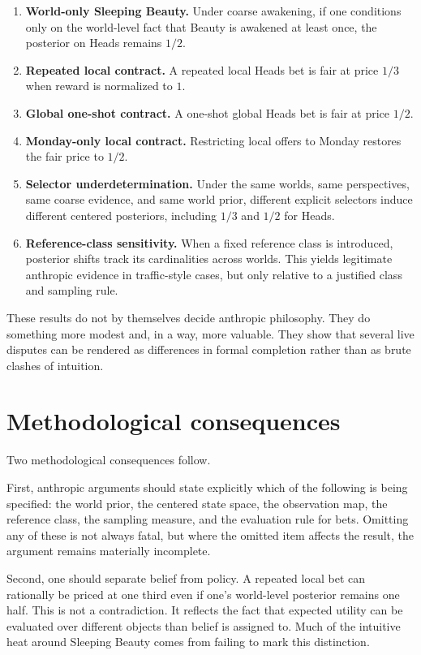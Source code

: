 \documentclass[11pt]{article}
\newcommand{\1}{\mathbf{1}}
\begin{document}
\begin{enumerate}[label=(\arabic*)]
  \item \textbf{World-only Sleeping Beauty.} Under coarse awakening, if one conditions only on the world-level fact that Beauty is awakened at least once, the posterior on Heads remains $1/2$.
  \item \textbf{Repeated local contract.} A repeated local Heads bet is fair at price $1/3$ when reward is normalized to $1$.
  \item \textbf{Global one-shot contract.} A one-shot global Heads bet is fair at price $1/2$.
  \item \textbf{Monday-only local contract.} Restricting local offers to Monday restores the fair price to $1/2$.
  \item \textbf{Selector underdetermination.} Under the same worlds, same perspectives, same coarse evidence, and same world prior, different explicit selectors induce different centered posteriors, including $1/3$ and $1/2$ for Heads.
  \item \textbf{Reference-class sensitivity.} When a fixed reference class is introduced, posterior shifts track its cardinalities across worlds. This yields legitimate anthropic evidence in traffic-style cases, but only relative to a justified class and sampling rule.
\end{enumerate}

These results do not by themselves decide anthropic philosophy. They do something more modest and, in a way, more valuable. They show that several live disputes can be rendered as differences in formal completion rather than as brute clashes of intuition.

\section{Methodological consequences}

Two methodological consequences follow.

First, anthropic arguments should state explicitly which of the following is being specified: the world prior, the centered state space, the observation map, the reference class, the sampling measure, and the evaluation rule for bets. Omitting any of these is not always fatal, but where the omitted item affects the result, the argument remains materially incomplete.

Second, one should separate belief from policy. A repeated local bet can rationally be priced at one third even if one's world-level posterior remains one half. This is not a contradiction. It reflects the fact that expected utility can be evaluated over different objects than belief is assigned to. Much of the intuitive heat around Sleeping Beauty comes from failing to mark this distinction.
\end{document}
